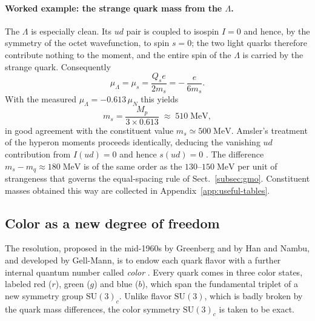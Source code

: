 \paragraph{Worked example: the strange quark mass from the $\Lambda$.}
The $\Lambda$ is especially clean. Its $ud$ pair is coupled to isospin $I=0$ and hence,
by the symmetry of the octet wavefunction, to spin $s=0$; the two light quarks therefore
contribute nothing to the moment, and the entire spin of the $\Lambda$ is carried by the
strange quark. Consequently
\begin{equation}
    \mu_\Lambda = \mu_s = \frac{Q_s e}{2 m_s} = -\,\frac{e}{6 m_s}.
    \label{eq:mu-lambda}
\end{equation}
With the measured $\mu_\Lambda = -0.613\,\mu_N$ this yields
\begin{equation}
    m_s = \frac{M_p}{3 \times 0.613} \;\approx\; 510\;\mathrm{MeV},
    \label{eq:ms-from-mulambda}
\end{equation}
in good agreement with the constituent value $m_s \simeq 500\;\mathrm{MeV}$. Amsler's
treatment of the hyperon moments proceeds identically, deducing the vanishing $ud$
contribution from $I(ud) = 0$ and hence $s(ud) = 0$ \cite[Ch.~14]{Amsler2018}. The difference
$m_s - m_q \approx 180\;\mathrm{MeV}$ is of the same order as the $130$--$150\;\mathrm{MeV}$
per unit of strangeness that governs the equal-spacing rule of Sect.~\ref{subsec:gmo}. Constituent masses obtained this
way are collected in Appendix~\ref{app:useful-tables}.

\FloatBarrier

\subsection{Color as a new degree of freedom}
\label{subsec:color-dof}

The resolution, proposed in the mid-1960s by Greenberg and by Han and Nambu, and
developed by Gell-Mann, is to endow each quark flavor with a further internal quantum
number called \emph{color} \cite[Ch.~10]{Amsler2018}. Every quark comes in three
color states, labeled red ($r$), green ($g$) and blue ($b$), which span the
fundamental triplet of a new symmetry group $\mathrm{SU}(3)_{c}$. Unlike flavor
$\mathrm{SU}(3)$, which is badly broken by the quark mass differences, the color
symmetry $\mathrm{SU}(3)_{c}$ is taken to be exact.

